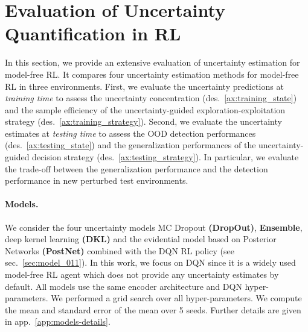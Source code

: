 \vspace{-3mm}
\section{Evaluation of Uncertainty Quantification in RL}
\label{sec:experiments_011}

In this section, we provide an extensive evaluation of uncertainty estimation for model-free RL. It compares four uncertainty estimation methods for model-free RL in three environments. First, we evaluate the uncertainty predictions at \emph{training time} to assess the uncertainty concentration (des.~\ref{ax:training_state}) and the sample efficiency of the uncertainty-guided exploration-exploitation strategy (des.~\ref{ax:training_strategy}). Second, we evaluate the uncertainty estimates at \emph{testing time} to assess the OOD detection performances (des.~\ref{ax:testing_state}) and the generalization performances of the uncertainty-guided decision strategy (des.~\ref{ax:testing_strategy}). In particular, we evaluate the trade-off between the generalization performance and the detection performance in new perturbed test environments.

\paragraph{Models.} We consider the four uncertainty models MC Dropout \textbf{(DropOut)}, \textbf{Ensemble}, deep kernel learning \textbf{(DKL)} and the evidential model based on Posterior Networks \textbf{(PostNet)} combined with the DQN RL policy (see sec.~\ref{sec:model_011}). In this work, we focus on DQN \cite{dqn} since it is a widely used model-free RL agent which does not provide any uncertainty estimates by default. All models use the same encoder architecture and DQN hyper-parameters. We performed a grid search over all hyper-parameters. We compute the mean and standard error of the mean over 5 seeds. Further details are given in app.~\ref{app:models-details}.

